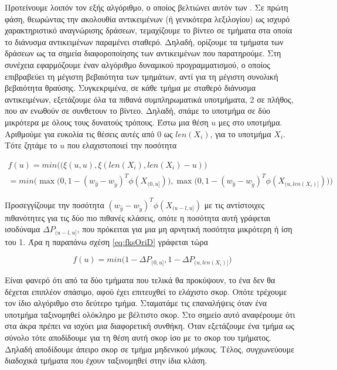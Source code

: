 \documentclass[11pt,a4paper,english,greek,twoside]{../Thesis}
\begin{document}
\par Προτείνουμε λοιπόν τον εξής αλγόριθμο, ο οποίος βελτιώνει αυτόν των \cite{hoai_2011}. Σε πρώτη φάση, θεωρώντας την ακολουθία αντικειμένων (ή γενικότερα λεξιλογίου) ως ισχυρό χαρακτηριστικό αναγνώρισης δράσεων, τεμαχίζουμε το βίντεο σε τμήματα στα οποία το διάνυσμα αντικειμένων παραμένει σταθερό. Δηλαδή, ορίζουμε τα τμήματα των δράσεων ως τα σημεία διαφοροποίησης των αντικειμένων που παρατηρούμε. Στη συνέχεια εφαρμόζουμε έναν αλγόριθμο δυναμικού προγραμματισμού, ο οποίος επιβραβεύει τη μέγιστη βεβαιότητα των τμημάτων, αντί για τη μέγιστη συνολική βεβαιότητα θραύσης. Συγκεκριμένα, σε κάθε τμήμα με σταθερό διάνυσμα αντικειμένων, εξετάζουμε όλα τα πιθανά συμπληρωματικά υποτμήματα, 2 σε πλήθος, που αν ενωθούν σε συνθετουν το βίντεο. Δηλαδή, σπάμε το υποτμήμα σε δύο μικρότερα με όλους τους δυνατούς τρόπους. Έστω μια θέση $u$ μες στο υποτμήμα. Αριθμούμε για ευκολία τις θέσεις αυτές από 0 ως $len(X_i)$, για το υποτμήμα $X_i$. Τότε ζητάμε το $u$ που ελαχιστοποιεί την ποσότητα

\begin{equation}\label{eq:fksOriD}
\begin{gathered}
    f(u)=min(\big( \xi(u,u), \xi(len(X_i),len(X_i)-u) \big) \\ =min\big( \max \big( 0,1-(w_{\hat{y}}-w_{\tilde{y}})^T \phi(X_{(0,u]}) \big), \max \big( 0,1-(w_{\hat{y}}-w_{\tilde{y}})^T \phi(X_{(u,len(X_i)]}) \big) \big)
\end{gathered}
\end{equation}

Προσεγγίζουμε την ποσότητα $(w_{\hat{y}}-w_{\tilde{y}})^T \phi(X_{(u-l,u]})$ με τις αντίστοιχες πιθανότητες για τις δύο πιο πιθανές κλάσεις, οπότε η ποσότητα αυτή γράφεται ισοδύναμα $\Delta P_{(u-l,u]}$, που πρόκειται για μια μη αρνητική ποσότητα μικρότερη ή ίση του 1. Άρα η παραπάνω σχέση \ref{eq:fksOriD} γράφεται τώρα

\begin{equation}\label{eq:fksOriD2}
    f(u)=min\big( 1-\Delta P_{(0,u]} , 1-\Delta P_{(u,len(X_i)]} \big)
\end{equation}

Είναι φανερό ότι από τα δύο τμήματα που τελικά θα προκύψουν, το ένα δεν θα δέχεται επιπλέον σπάσιμο, αφού έχει επιτευχθεί το ελάχιστο σκορ. Οπότε τρέχουμε τον ίδιο αλγόριθμο στο δεύτερο τμήμα. Σταματάμε τις επαναλήψεις όταν ένα υποτμήμα ταξινομηθεί ολόκληρο με βέλτιστο σκορ. Στο σημείο αυτό αναφέρουμε ότι στα άκρα πρέπει να ισχύει μια διαφορετική συνθήκη. Όταν εξετάζουμε ένα τμήμα ως σύνολο τότε αποδίδουμε για τη θέση αυτή σκορ ίσο με το σκορ του τμήματος. Δηλαδή αποδίδουμε άπειρο σκορ σε τμήμα μηδενικού μήκους. Τέλος, συγχωνεύουμε διαδοχικά τμήματα που έχουν ταξινομηθεί στην ίδια κλάση.
\end{document}
